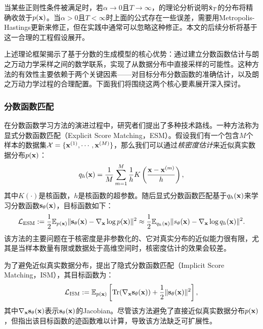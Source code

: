 \documentclass[11pt,a4paper,UTF8]{ctexart}
\begin{document}
当某些正则性条件被满足时，若$\alpha\rightarrow 0$且$T\rightarrow \infty$，\cite{max2011bayesian}的理论分析说明$\tilde{\mathbf{x}}_T$的分布将精确收敛于$p(\mathbf{x})$。当$\alpha> 0$且$T< \infty$时上面的公式存在一些误差，需要用Metropolis-Hastings更新来修正，但在实践中通常可以忽略这种修正\cite{du2019implicit,nijkamp2019anatomy}。本文的后续分析将基于这一合理的工程假设展开。

上述理论框架揭示了基于分数的生成模型的核心优势：通过建立分数函数估计与朗之万动力学采样之间的数学联系，实现了从数据分布中直接采样的可能性。这种方法的有效性主要依赖于两个关键因素——对目标分布分数函数的准确估计，以及朗之万动力学过程的合理配置。下面我们将围绕这两个核心要素展开深入探讨。

\subsubsection{分数函数匹配}

在分数函数学习方法的演进过程中，研究者们提出了多种技术路线。一种方法称为显式分数函数匹配（Explicit Score Matching，ESM）\cite{vincent2011connection}。假设我们有一个包含$M$个样本的数据集$\mathcal{X}=\{\mathbf{x}^{(1)},\cdots,\mathbf{x}^{(M)}\}$，那么我们可以通过\emph{核密度估计}来近似真实数据分布$p(\mathbf{x})$：
\begin{equation*}
    q_h(\mathbf{x})=\frac{1}{M}\sum_{m=1}^M \frac{1}{h} K\left(\frac{\mathbf{x}-\mathbf{x}^{(m)}}{h} \right),
\end{equation*}
其中$K(\cdot)$是核函数，$h$是核函数的超参数。随后显式分数函数匹配基于$q_h(\mathbf{x})$来学习分数函数$\mathbf{s}_\theta(\mathbf{x})$，目标函数如下：
\begin{equation*}
    \mathcal{L}_{\text{ESM}}:=\frac{1}{2}\mathbb{E}_{p(\mathbf{x})} \|\mathbf{s}_\theta(\mathbf{x})-\nabla_{\mathbf{x}}\log p(\mathbf{x}) \|^2 \approx \frac{1}{2}\mathbb{E}_{q_h(\mathbf{x})} \| s_\theta(\mathbf{x})-\nabla_{\mathbf{x}}\log q_h(\mathbf{x})\|^2.
\end{equation*}
该方法的主要问题在于核密度是非参数化的、它对真实分布的近似能力很有限，尤其是当样本数量有限或数据处于高维空间时，核密度估计的效果会较差。

为了避免近似真实数据分布，\cite{Hyvrinen2005EstimationON}提出了隐式分数函数匹配（Implicit Score Matching，ISM），其目标函数为：
\begin{equation*}
    \mathcal{L}_{\text{ISM}}:=\mathbb{E}_{p(\mathbf{x})} \left[\text{Tr}(\nabla_{\mathbf{x}} \mathbf{s}_\theta (\mathbf{x})) + \frac{1}{2}\|\mathbf{s}_\theta (\mathbf{x}) \|^2 \right],
\end{equation*}
其中$\nabla_{\mathbf{x}} \mathbf{s}_\theta (\mathbf{x})$表示$\mathbf{s}_\theta (\mathbf{x})$的Jacobian。尽管该方法避免了直接近似真实数据分布$p(\mathbf{x})$，但\cite{song2019generative}指出该目标函数的迹函数难以计算，导致该方法缺乏可扩展性。
\end{document}
